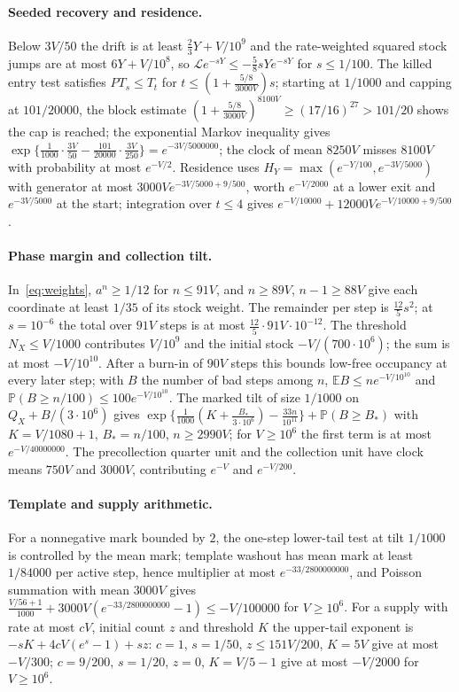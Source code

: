 \documentclass[11pt,a4paper]{article}
\theoremstyle{plain}
\theoremstyle{definition}
\theoremstyle{remark}
\newcommand{\Prob}{\mathbb P}
\newcommand{\E}{\mathbb E}
\newcommand{\Lgen}{\mathcal L}
\begin{document}
\paragraph{Seeded recovery and residence.}
Below $3V/50$ the drift is at least $\tfrac23Y+V/10^9$ and the rate-weighted squared stock jumps are at most $6Y+V/10^8$, so $\Lgen e^{-sY}\le-\tfrac58sYe^{-sY}$ for $s\le1/100$. The killed entry test satisfies $PT_s\le T_t$ for $t\le(1+\tfrac{5/8}{3000V})s$; starting at $1/1000$ and capping at $101/20000$, the block estimate $(1+\tfrac{5/8}{3000V})^{8100V}\ge(17/16)^{27}>101/20$ shows the cap is reached; the exponential Markov inequality gives $\exp\{\tfrac1{1000}\cdot\tfrac{3V}{50}-\tfrac{101}{20000}\cdot\tfrac{3V}{250}\}=e^{-3V/5000000}$; the clock of mean $8250V$ misses $8100V$ with probability at most $e^{-V/2}$. Residence uses $H_Y=\max(e^{-Y/100},e^{-3V/5000})$ with generator at most $3000Ve^{-3V/5000+9/500}$, worth $e^{-V/2000}$ at a lower exit and $e^{-3V/5000}$ at the start; integration over $t\le4$ gives $e^{-V/10000}+12000Ve^{-V/10000+9/500}$.

\paragraph{Phase margin and collection tilt.}
In~\eqref{eq:weights}, $a^n\ge1/12$ for $n\le91V$, and $n\ge89V$, $n-1\ge88V$ give each coordinate at least $1/35$ of its stock weight. The remainder per step is $\tfrac{12}5s^2$; at $s=10^{-6}$ the total over $91V$ steps is at most $\tfrac{12}5\cdot91V\cdot10^{-12}$. The threshold $N_X\le V/1000$ contributes $V/10^9$ and the initial stock $-V/(700\cdot10^6)$; the sum is at most $-V/10^{10}$. After a burn-in of $90V$ steps this bounds low-free occupancy at every later step; with $B$ the number of bad steps among $n$, $\E B\le ne^{-V/10^{10}}$ and $\Prob(B\ge n/100)\le100e^{-V/10^{10}}$. The marked tilt of size $1/1000$ on $Q_X+B/(3\cdot10^6)$ gives $\exp\{\tfrac1{1000}(K+\tfrac{B_*}{3\cdot10^6})-\tfrac{33n}{10^{11}}\}+\Prob(B\ge B_*)$ with $K=V/1080+1$, $B_*=n/100$, $n\ge2990V$; for $V\ge10^6$ the first term is at most $e^{-V/40000000}$. The precollection quarter unit and the collection unit have clock means $750V$ and $3000V$, contributing $e^{-V}$ and $e^{-V/200}$.

\paragraph{Template and supply arithmetic.}
For a nonnegative mark bounded by $2$, the one-step lower-tail test at tilt $1/1000$ is controlled by the mean mark; template washout has mean mark at least $1/84000$ per active step, hence multiplier at most $e^{-33/2800000000}$, and Poisson summation with mean $3000V$ gives $\tfrac{V/56+1}{1000}+3000V(e^{-33/2800000000}-1)\le-V/100000$ for $V\ge10^6$. For a supply with rate at most $cV$, initial count $z$ and threshold $K$ the upper-tail exponent is $-sK+4cV(e^s-1)+sz$: $c=1$, $s=1/50$, $z\le151V/200$, $K=5V$ give at most $-V/300$; $c=9/200$, $s=1/20$, $z=0$, $K=V/5-1$ give at most $-V/2000$ for $V\ge10^6$.
\end{document}
